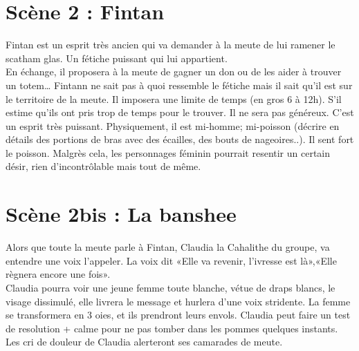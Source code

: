 \documentclass[oneside,12pt]{book}
\begin{document}
\begin{flushleft}
\section{Scène 2 : Fintan}
Fintan est un esprit très ancien qui va demander à la meute de lui ramener le scatham glas. Un fétiche puissant qui lui appartient.\\
En échange, il proposera à la meute de gagner un don ou de les aider à trouver un totem… Fintann ne sait pas à quoi ressemble le fétiche mais il sait qu'il est sur le territoire de la meute. Il imposera une limite de temps (en gros 6 à 12h). S'il estime qu'ils ont pris trop de temps pour le trouver. Il ne sera pas généreux.
C'est un esprit très puissant.
Physiquement, il est mi-homme; mi-poisson (décrire en détails des portions de bras avec des écailles, des bouts de nageoires..). Il sent fort le poisson. Malgrès cela, les personnages féminin pourrait resentir un certain désir, rien d'incontrôlable mais tout de même.


\section{Scène 2bis : La banshee}
Alors que toute la meute parle à Fintan, Claudia la Cahalithe du groupe, va entendre une voix l'appeler. La voix dit «Elle va revenir, l'ivresse est là»,«Elle règnera encore une fois».\\ Claudia pourra voir une jeune femme toute blanche, vétue de draps blancs, le visage dissimulé, elle livrera le message et hurlera d'une voix stridente. La femme se transformera en 3 oies, et ils prendront leurs envols.
Claudia peut faire un test de resolution + calme pour ne pas tomber dans les pommes quelques instants. Les cri de douleur de Claudia alerteront ses camarades de meute.


\end{flushleft}
\end{document}
